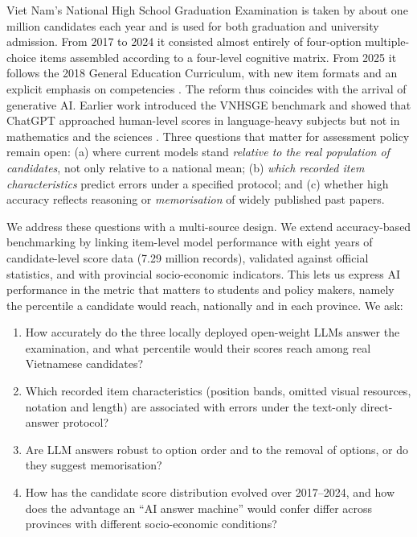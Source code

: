 \documentclass[preprint,12pt,authoryear,nonatbib]{elsarticle}
\begin{document}
Viet Nam's National High School Graduation Examination is taken by about one million candidates each year and is used for both graduation and university admission. From 2017 to 2024 it consisted almost entirely of four-option multiple-choice items assembled according to a four-level cognitive matrix. From 2025 it follows the 2018 General Education Curriculum, with new item formats and an explicit emphasis on competencies \citep{moet2023plan}. The reform thus coincides with the arrival of generative AI. Earlier work introduced the VNHSGE benchmark and showed that ChatGPT approached human-level scores in language-heavy subjects but not in mathematics and the sciences \citep{dao2023vnhsge,dao2023math}. Three questions that matter for assessment policy remain open: (a) where current models stand \emph{relative to the real population of candidates}, not only relative to a national mean; (b) \emph{which recorded item characteristics} predict errors under a specified protocol; and (c) whether high accuracy reflects reasoning or \emph{memorisation} of widely published past papers.

We address these questions with a multi-source design. We extend accuracy-based benchmarking by linking item-level model performance with eight years of candidate-level score data (7.29 million records), validated against official statistics, and with provincial socio-economic indicators. This lets us express AI performance in the metric that matters to students and policy makers, namely the percentile a candidate would reach, nationally and in each province. We ask:

\begin{enumerate}[label=\textbf{RQ\arabic*.},leftmargin=*]
  \item How accurately do the three locally deployed open-weight LLMs answer the examination, and what percentile would their scores reach among real Vietnamese candidates?
  \item Which recorded item characteristics (position bands, omitted visual resources, notation and length) are associated with errors under the text-only direct-answer protocol?
  \item Are LLM answers robust to option order and to the removal of options, or do they suggest memorisation?
  \item How has the candidate score distribution evolved over 2017--2024, and how does the advantage an ``AI answer machine'' would confer differ across provinces with different socio-economic conditions?
\end{enumerate}
\end{document}
